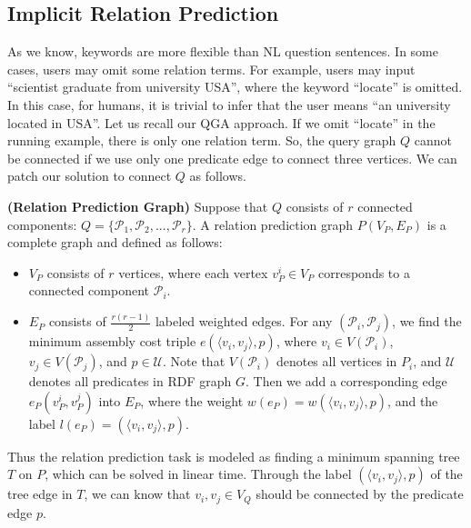 \subsection{Implicit Relation Prediction}
As we know, keywords are more flexible than NL question sentences. In some cases, users may omit some relation terms. For example, users may input ``scientist graduate from university USA'', where the keyword ``locate'' is omitted. In this case, for humans, it is trivial to infer that the user means ``an university located in USA''. Let us recall our QGA approach. If we omit ``locate'' in the running example, there is only one relation term. So, the query graph $Q$ cannot be connected if we use only one predicate edge to connect three vertices. We can patch our solution to connect $Q$ as follows.

\begin{definition} \textbf{ (Relation Prediction Graph) }
	Suppose that $Q$ consists of $r$ connected components: $Q=\{\mathcal{P}_1, \mathcal{P}_2, ..., \mathcal{P}_r\}$. A relation prediction graph $P(V_P,E_P)$ is a complete graph and defined as follows:
	\begin{itemize}
		\item $V_P$ consists of $r$ vertices, where each vertex $v_P^i \in V_P$ corresponds to a connected component $\mathcal{P}_i$.
		\item $E_P$ consists of $\frac{r(r-1)}{2}$ labeled weighted edges. For any $(\mathcal{P}_i, \mathcal{P}_j)$, we find the minimum assembly cost triple $e(\langle v_i, v_j \rangle, p)$, where $v_i \in V(\mathcal{P}_i)$, $v_j \in V(\mathcal{P}_j)$, and $p \in \mathcal{U}$. Note that $V(\mathcal{P}_i)$ denotes all vertices in $P_i$, and $\mathcal{U}$ denotes all predicates in RDF graph $G$. Then we add a corresponding edge $e_P(v_P^i,v_P^j)$ into $E_P$, where the weight $w(e_P)=w(\langle v_i, v_j \rangle, p)$, and the label $l(e_P)=(\langle v_i, v_j \rangle, p)$.
	\end{itemize}
\end{definition}
Thus the relation prediction task is modeled as finding a minimum spanning tree $T$ on $P$, which can be solved in linear time. Through the label $(\langle v_i, v_j \rangle, p)$ of the tree edge in $T$, we can know that $v_i, v_j \in V_Q$ should be connected by the predicate edge $p$.


